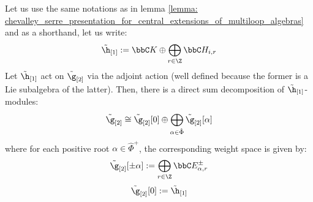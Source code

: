         \begin{proposition} \label{prop: root_space_decomposition_for_toroidal_lie_algebras}
            Let us use the same notations as in lemma \ref{lemma: chevalley_serre_presentation_for_central_extensions_of_multiloop_algebras} and as a shorthand, let us write:
                $$\tilde{\h}_{[1]} := \bbC K \oplus \bigoplus_{r \in \Z} \bbC H_{i, r}$$
            Let $\tilde{\h}_{[1]}$ act on $\tilde{\g}_{[2]}$ via the adjoint action (well defined because the former is a Lie subalgebra of the latter). Then, there is a direct sum decomposition of $\tilde{\h}_{[1]}$-modules:
                $$\tilde{\g}_{[2]} \cong \tilde{\g}_{[2]}[0] \oplus \bigoplus_{\alpha \in \hat{\Phi}} \tilde{\g}_{[2]}[\alpha]$$
            where for each positive root $\alpha \in \hat{\Phi}^+$, the corresponding weight space is given by:
                $$\tilde{\g}_{[2]}[\pm \alpha] := \bigoplus_{r \in \Z} \bbC E_{\alpha, r}^{\pm}$$
                $$\tilde{\g}_{[2]}[0] := \tilde{\h}_{[1]}$$
        \end{proposition}
